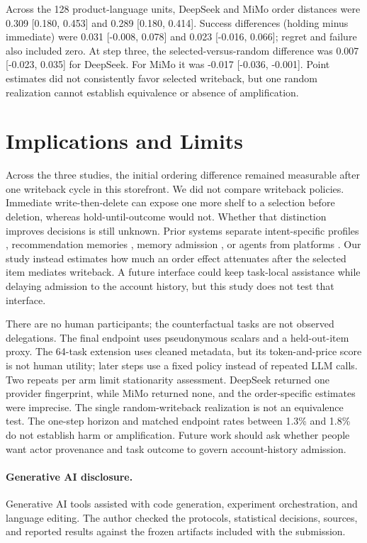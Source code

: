 \documentclass[sigconf,review,anonymous]{acmart}
\begin{document}
Across the 128 product-language units, DeepSeek and MiMo order distances were
0.309 [0.180, 0.453] and 0.289 [0.180, 0.414]. Success differences (holding minus immediate)
were 0.031 [-0.008, 0.078] and 0.023 [-0.016, 0.066]; regret and failure also
included zero. At step three, the selected-versus-random difference was 0.007
[-0.023, 0.035] for DeepSeek. For MiMo it was -0.017 [-0.036, -0.001]. Point
estimates did not consistently favor selected writeback, but one random
realization cannot establish equivalence or absence of amplification.

\section{Implications and Limits}

Across the three studies, the initial ordering difference remained measurable
after one writeback cycle in this storefront. We did not compare writeback
policies. Immediate write-then-delete can expose one more shelf to a selection
before deletion, whereas hold-until-outcome would not. Whether that distinction
improves decisions is still unknown. Prior systems separate intent-specific
profiles \cite{tsukuda2025intent}, recommendation memories
\cite{zhan2026calmrec}, memory admission \cite{xiong2026memory}, or agents from
platforms \cite{xu2025iagent}. Our study instead estimates how much an order
effect attenuates after the selected item mediates writeback. A future interface
could keep task-local assistance while delaying admission to the account
history, but this study does not test that interface.

There are no human participants; the counterfactual tasks are not observed
delegations. The final endpoint uses pseudonymous scalars and a held-out-item
proxy. The 64-task extension uses cleaned metadata, but its token-and-price
score is not human utility; later steps use a fixed policy instead of repeated
LLM calls. Two repeats per arm limit stationarity assessment. DeepSeek returned
one provider fingerprint, while MiMo returned none, and the order-specific
estimates were imprecise. The single random-writeback realization is not an
equivalence test. The one-step
horizon and matched endpoint rates between 1.3\% and 1.8\% do not establish harm
or amplification.
Future work should ask whether people want actor provenance and task outcome to
govern account-history admission.

\paragraph{Generative AI disclosure.} Generative AI tools assisted with code
generation, experiment orchestration, and language editing. The author checked
the protocols, statistical decisions, sources, and reported results against the
frozen artifacts included with the submission.

\balance


\end{document}
